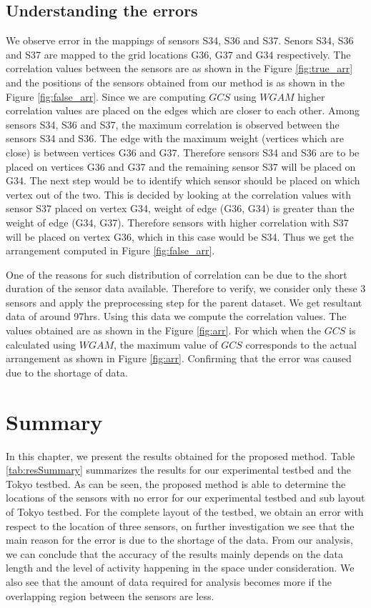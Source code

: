 \subsection{Understanding the errors}
We observe error in the mappings of sensors S34, S36 and S37. Senors S34, S36 and S37 are mapped to the grid locations G36, G37 and G34 respectively. The correlation values between the sensors are as shown in the Figure \ref{fig:true_arr} and the positions of the sensors obtained from our method is as shown in the Figure \ref{fig:false_arr}. Since we are computing $GCS$ using $WGAM$ higher correlation values are placed on the edges which are closer to each other. Among sensors S34, S36 and S37, the maximum correlation is observed between the sensors S34 and S36. The edge with the maximum weight (vertices which are close) is between vertices G36 and G37. Therefore sensors S34 and S36 are to be placed on vertices G36 and G37 and the remaining sensor S37 will be placed on G34. The next step would be to identify which sensor should be placed on which vertex out of the two. This is decided by looking at the correlation values with sensor S37 placed on vertex G34, weight of edge (G36, G34) is greater than the weight of edge (G34, G37). Therefore sensors with higher correlation with S37 will be placed on vertex G36, which in this case would be S34. Thus we get the arrangement computed in Figure \ref{fig:false_arr}.


One of the reasons for such distribution of correlation can be due to the short duration of the sensor data available. Therefore to verify, we consider only these 3 sensors and apply the preprocessing step for the parent dataset. We get resultant data of around 97hrs. Using this data we compute the correlation values. The values obtained are as shown in the Figure \ref{fig:arr}. For which when the $GCS$ is calculated using $WGAM$, the maximum value of $GCS$ corresponds to the actual arrangement as shown in Figure \ref{fig:arr}. Confirming that the error was caused due to the shortage of data.


\section{Summary}

In this chapter, we present the results obtained for the proposed method. Table \ref{tab:resSummary} summarizes the results for our experimental testbed and the Tokyo testbed. As can be seen, the proposed method is able to determine the locations of the sensors with no error for our experimental testbed and sub layout of Tokyo testbed. For the complete layout of the testbed, we obtain an error with respect to the location of three sensors, on further investigation we see that the main reason for the error is due to the shortage of the data. From our analysis, we can conclude that the accuracy of the results mainly depends on the data length and the level of activity happening in the space under consideration. We also see that the amount of data required for analysis becomes more if the overlapping region between the sensors are less.


